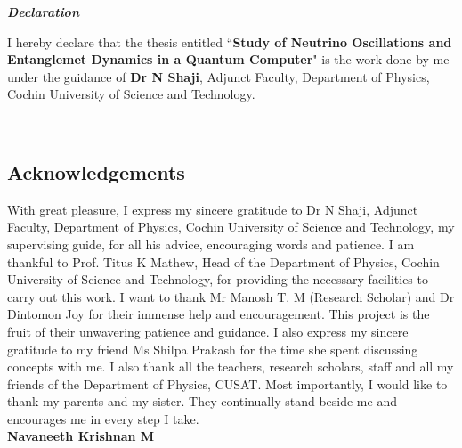\documentclass[12pt,a4paper]{report}
\begin{document}
 \newpage
\thispagestyle{empty}
\vspace{2cm}
\begin{center}
	\vspace{2cm}
	\emph{\LARGE\textbf{Declaration}}\\[1.8cm]
\end{center} 
I hereby declare that the thesis entitled ``\textbf{Study of Neutrino Oscillations and Entanglemet Dynamics in a Quantum Computer}" is the work done by me under the guidance of \textbf{Dr N Shaji}, Adjunct Faculty, Department of Physics, Cochin University of Science and Technology.

\vspace{2.5cm}
\\
\begin{center}
	\chapter*{Acknowledgements}
\end{center}

With great pleasure, I express my sincere gratitude to Dr N Shaji, Adjunct Faculty, Department of Physics, Cochin University of Science and Technology, my supervising guide, for all his advice, encouraging words and patience. I am thankful to Prof. Titus K Mathew, Head of the Department of Physics, Cochin University of Science and Technology, for providing the necessary facilities to carry out this work. I want to thank Mr Manosh T. M (Research Scholar) and Dr Dintomon Joy for their immense help and encouragement. This project is the fruit of their unwavering patience and guidance. I also express my sincere gratitude to my friend Ms Shilpa Prakash for the time she spent discussing concepts with me. I also thank all the teachers, research scholars, staff and all my friends of the Department of Physics, CUSAT.  Most importantly, I would like to thank my parents and my sister. They continually stand beside me and encourages me in every step I take.\\ 

\hfill \textbf{Navaneeth Krishnan M}
\end{document}
